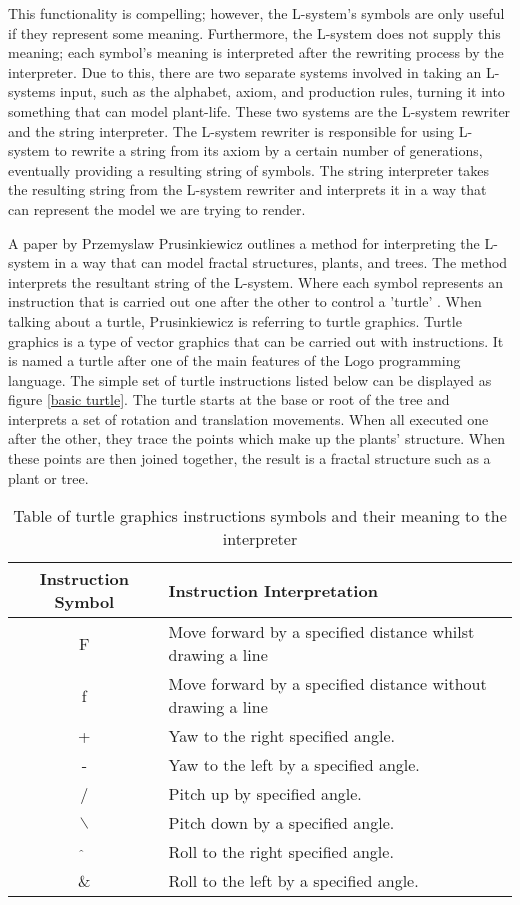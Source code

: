 This functionality is compelling; however, the L-system's symbols are only useful if they represent some meaning. Furthermore, the L-system does not supply this meaning; each symbol's meaning is interpreted after the rewriting process by the interpreter. Due to this, there are two separate systems involved in taking an L-systems input, such as the alphabet, axiom, and production rules, turning it into something that can model plant-life. These two systems are the L-system rewriter and the string interpreter. The L-system rewriter is responsible for using L-system to rewrite a string from its axiom by a certain number of generations, eventually providing a resulting string of symbols. The string interpreter takes the resulting string from the L-system rewriter and interprets it in a way that can represent the model we are trying to render. 

A paper by Przemyslaw Prusinkiewicz outlines a method for interpreting the L-system in a way that can model fractal structures, plants, and trees. The method interprets the resultant string of the L-system. Where each symbol represents an instruction that is carried out one after the other to control a 'turtle' \cite{prusinkiewicz1986graphical}. When talking about a turtle, Prusinkiewicz is referring to turtle graphics. Turtle graphics is a type of vector graphics that can be carried out with instructions. It is named a turtle after one of the main features of the Logo programming language. The simple set of turtle instructions listed below can be displayed as figure \ref{basic turtle}. The turtle starts at the base or root of the tree and interprets a set of rotation and translation movements. When all executed one after the other, they trace the points which make up the plants' structure. When these points are then joined together, the result is a fractal structure such as a plant or tree.

\begin{table}[h!]
\centering
\begin{tabular}{ | c | l | }
\hline
	Instruction Symbol 	& Instruction Interpretation \\  
\hline
\hline
	F 					& Move forward by a specified distance whilst drawing a line\\
\hline
	f 					& Move forward by a specified distance without drawing a line\\
\hline
	+ 					& Yaw to the right specified angle.\\
\hline
	- 					& Yaw to the left by a specified angle.\\
\hline
	/ 					& Pitch up by specified angle. \\
\hline
	$\backslash$ 		& Pitch down by a specified angle.\\
\hline
	$\hat{}$ 			& Roll to the right specified angle.\\
\hline
	\& 					& Roll to the left by a specified angle.\\
\hline
\end{tabular}
\caption{Table of turtle graphics instructions symbols and their meaning to the interpreter}
\label{DOL-system instructions}
\end{table}
\FloatBarrier


